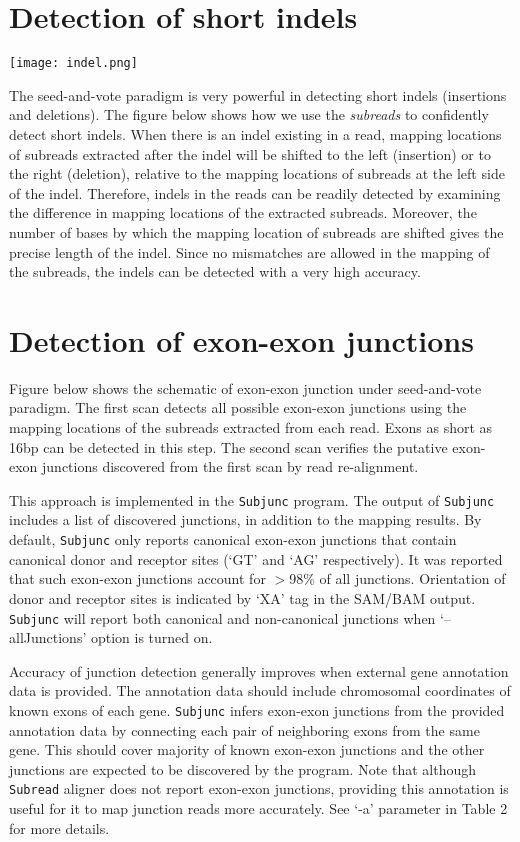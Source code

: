 \documentclass[12pt]{report}
\newcommand{\code}[1]{{\small\texttt{#1}}}
\begin{document}
\section{Detection of short indels}

\begin{center}
\texttt{[image: indel.png]}
\end{center}

The seed-and-vote paradigm is very powerful in detecting short indels (insertions and deletions).
The figure below shows how we use the \emph{subreads} to confidently detect short indels.
When there is an indel existing in a read, mapping locations of subreads extracted after the indel will be shifted to the left (insertion) or to the right (deletion), relative to the mapping locations of subreads at the left side of the indel.
Therefore, indels in the reads can be readily detected by examining the difference in mapping locations of the extracted subreads.
Moreover, the number of bases by which the mapping location of subreads are shifted gives the precise length of the indel.
Since no mismatches are allowed in the mapping of the subreads, the indels can be detected with a very high accuracy.


\section{Detection of exon-exon junctions}
\label{sec:junction}

Figure below shows the schematic of exon-exon junction under seed-and-vote paradigm.
The first scan detects all possible exon-exon junctions using the mapping locations of the subreads extracted from each read.
Exons as short as 16bp can be detected in this step.
The second scan verifies the putative exon-exon junctions discovered from the first scan by read re-alignment.

This approach is implemented in the \code{Subjunc} program.
The output of \code{Subjunc} includes a list of discovered junctions, in addition to the mapping results.
By default, \code{Subjunc} only reports canonical exon-exon junctions that contain canonical donor and receptor sites (`GT' and `AG' respectively).
It was reported that such exon-exon junctions account for $>$98\% of all junctions.
Orientation of donor and receptor sites is indicated by `XA' tag in the SAM/BAM output.
\code{Subjunc} will report both canonical and non-canonical junctions when `--allJunctions' option is turned on.

Accuracy of junction detection generally improves when external gene annotation data is provided.
The annotation data should include chromosomal coordinates of known exons of each gene.
\code{Subjunc} infers exon-exon junctions from the provided annotation data by connecting each pair of neighboring exons from the same gene.
This should cover majority of known exon-exon junctions and the other junctions are expected to be discovered by the program.
Note that although \code{Subread} aligner does not report exon-exon junctions, providing this annotation is useful for it to map junction reads more accurately.
See `-a' parameter in Table 2 for more details.
\end{document}
